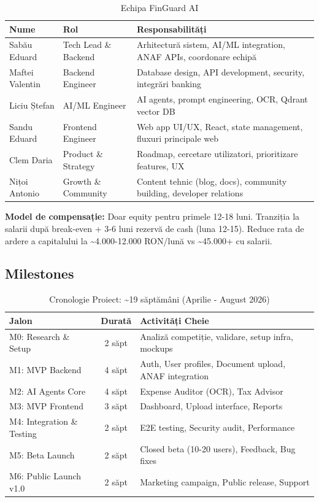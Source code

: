 \documentclass[11pt,a4paper]{article}
\begin{document}
\begin{table}[H]
\centering
\small
\begin{tabularx}{\textwidth}{|l|l|X|}
\hline
\rowcolor{lightgray}
\textbf{Nume} & \textbf{Rol} & \textbf{Responsabilități} \\
\hline
Sabău Eduard & Tech Lead \& Backend & Arhitectură sistem, AI/ML integration, ANAF APIs, coordonare echipă \\
\hline
Maftei Valentin & Backend Engineer & Database design, API development, security, integrări banking \\
\hline
Liciu Ștefan & AI/ML Engineer & AI agents, prompt engineering, OCR, Qdrant vector DB \\
\hline
Sandu Eduard & Frontend Engineer & Web app UI/UX, React, state management, fluxuri principale web \\
\hline
Clem Daria & Product \& Strategy & Roadmap, cercetare utilizatori, prioritizare features, UX \\
\hline
Nițoi Antonio & Growth \& Community & Content tehnic (blog, docs), community building, developer relations \\
\hline
\end{tabularx}
\caption{Echipa FinGuard AI}
\end{table}

\textbf{Model de compensație:} Doar equity pentru primele 12-18 luni. Tranziția la salarii după break-even + 3-6 luni rezervă de cash (luna 12-15). Reduce rata de ardere a capitalului la \textasciitilde4.000-12.000 RON/lună vs \textasciitilde45.000+ cu salarii.

\subsection{Milestones}

\begin{table}[H]
\centering
\small
\begin{tabularx}{\textwidth}{|l|c|X|}
\hline
\rowcolor{lightgray}
\textbf{Jalon} & \textbf{Durată} & \textbf{Activități Cheie} \\
\hline
M0: Research \& Setup & 2 săpt & Analiză competiție, validare, setup infra, mockups \\
\hline
M1: MVP Backend & 4 săpt & Auth, User profiles, Document upload, ANAF integration \\
\hline
M2: AI Agents Core & 4 săpt & Expense Auditor (OCR), Tax Advisor \\
\hline
M3: MVP Frontend & 3 săpt & Dashboard, Upload interface, Reports \\
\hline
M4: Integration \& Testing & 2 săpt & E2E testing, Security audit, Performance \\
\hline
M5: Beta Launch & 2 săpt & Closed beta (10-20 users), Feedback, Bug fixes \\
\hline
M6: Public Launch v1.0 & 2 săpt & Marketing campaign, Public release, Support \\
\hline
\end{tabularx}
\caption{Cronologie Proiect: \textasciitilde19 săptămâni (Aprilie - August 2026)}
\end{table}
\end{document}
